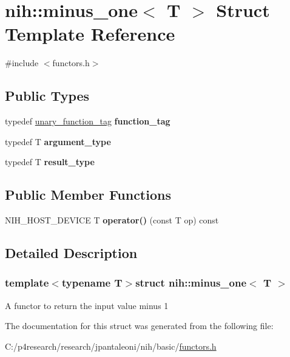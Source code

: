 \hypertarget{structnih_1_1minus__one}{
\section{nih\-:\-:minus\-\_\-one$<$ \-T $>$ \-Struct \-Template \-Reference}
\label{structnih_1_1minus__one}
}


{\ttfamily \#include $<$functors.\-h$>$}

\subsection*{\-Public \-Types}
\begin{DoxyCompactItemize}
\item 
\hypertarget{structnih_1_1minus__one_aac7a171a284a4173596317fd0f785238}{
typedef \hyperlink{structnih_1_1unary__function__tag}{unary\-\_\-function\-\_\-tag} {\bfseries function\-\_\-tag}}
\label{structnih_1_1minus__one_aac7a171a284a4173596317fd0f785238}

\item 
\hypertarget{structnih_1_1minus__one_ae6121aeabab3cfe39d07eaf1f0cfae4a}{
typedef \-T {\bfseries argument\-\_\-type}}
\label{structnih_1_1minus__one_ae6121aeabab3cfe39d07eaf1f0cfae4a}

\item 
\hypertarget{structnih_1_1minus__one_a776be8237b981f00e0a68d04421292d9}{
typedef \-T {\bfseries result\-\_\-type}}
\label{structnih_1_1minus__one_a776be8237b981f00e0a68d04421292d9}

\end{DoxyCompactItemize}
\subsection*{\-Public \-Member \-Functions}
\begin{DoxyCompactItemize}
\item 
\hypertarget{structnih_1_1minus__one_acc1f63fa4fb338bbcbc313006778e8ac}{
\-N\-I\-H\-\_\-\-H\-O\-S\-T\-\_\-\-D\-E\-V\-I\-C\-E \-T {\bfseries operator()} (const \-T op) const }
\label{structnih_1_1minus__one_acc1f63fa4fb338bbcbc313006778e8ac}

\end{DoxyCompactItemize}


\subsection{\-Detailed \-Description}
\subsubsection*{template$<$typename T$>$struct nih\-::minus\-\_\-one$<$ T $>$}

\-A functor to return the input value minus 1 

\-The documentation for this struct was generated from the following file\-:\begin{DoxyCompactItemize}
\item 
\-C\-:/p4research/research/jpantaleoni/nih/basic/\hyperlink{functors_8h}{functors.\-h}\end{DoxyCompactItemize}
